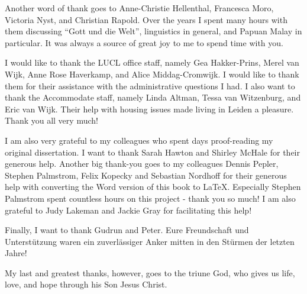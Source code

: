 \begin{refsection}
Another word of thank goes to Anne-Christie Hellenthal, Francesca Moro, Victoria Nyst, and Christian Rapold. Over the years I spent many hours with them discussing “Gott und die Welt”, linguistics in general, and Papuan Malay in particular. It was always a source of great joy to me to spend time with you.

I would like to thank the LUCL office staff, namely Gea Hakker-Prins, Merel van Wijk, Anne Rose Haverkamp, and Alice Middag-Cromwijk. I would like to thank them for their assistance with the administrative questions I had. I also want to thank the Accommodate staff, namely Linda Altman, Tessa van Witzenburg, and Eric van Wijk. Their help with housing issues made living in Leiden a pleasure. Thank you all very much!

I am also very grateful to my colleagues who spent days proof-reading my original dissertation. I want to thank Sarah Hawton and Shirley McHale for their generous help. Another big thank-you goes to my colleagues Dennis Pepler, Stephen Palmstrom, Felix Kopecky and Sebastian Nordhoff for their generous help with converting the Word version of this book to LaTeX. Especially Stephen Palmstrom spent countless hours on this project - thank you so much! I am also grateful to Judy Lakeman and Jackie Gray for facilitating this help!

Finally, I want to thank Gudrun and Peter. Eure Freundschaft und Unterstützung waren ein zuverlässiger Anker mitten in den Stürmen der letzten Jahre!

My last and greatest thanks, however, goes to the triune God, who gives us life, love, and hope through his Son Jesus Christ.

\printbibliography[heading=subbibliography]
\end{refsection}

